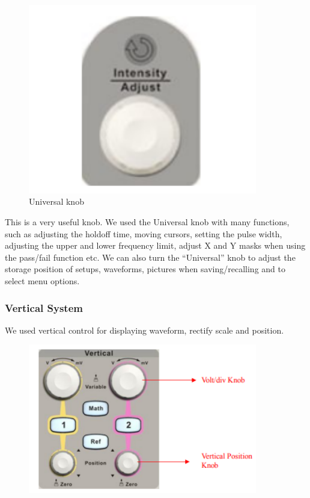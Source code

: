 \begin{figure}[H]
	\centering
	\includegraphics[width=10cm]{images/17.png}
	\caption{Universal knob}
	\label{fig:wow7}
\end{figure}

This is a very useful knob. We used the Universal knob with many functions, such as adjusting the
  holdoff time, moving cursors, setting the pulse width, adjusting the upper and lower frequency limit, adjust X and Y masks when
  using the pass/fail function etc. We can also turn the “Universal” knob to
  adjust the storage position of setups, waveforms, pictures when
  saving/recalling and to select menu options.

\subsubsection*{Vertical System}
We used vertical control for displaying waveform, rectify scale and
position.

\begin{figure}[H]
	\centering
	\includegraphics[width=10cm]{images/18.png}
	\label{fig:wow8}
\end{figure}


